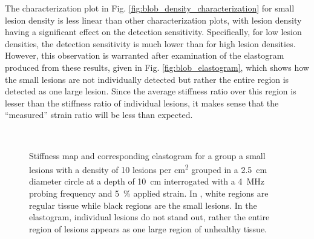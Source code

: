 			The characterization plot in Fig. \ref{fig:blob_density_characterization} for small lesion density is less linear than other characterization plots, with lesion density having a significant effect on the detection sensitivity. Specifically, for low lesion densities, the detection sensitivity is much lower than for high lesion densities. However, this observation is warranted after examination of the elastogram produced from these results, given in Fig. \ref{fig:blob_elastogram}, which shows how the small lesions are not individually detected but rather the entire region is detected as one large lesion. Since the average stiffness ratio over this region is lesser than the stiffness ratio of individual lesions, it makes sense that the ``measured'' strain ratio will be less than expected.

			\begin{figure}[!htb]
				\centering
				~
				\caption[Sample elastogram for a set of clustered lesions]{Stiffness map \protect{} and corresponding elastogram \protect{} for a group a small lesions with a density of 10 lesions per \si{\cm\squared} grouped in a \SI{2.5}{\cm} diameter circle at a depth of \SI{10}{\cm} interrogated with a \SI{4}{\MHz} probing frequency and \SI{5}{\percent} applied strain. In \protect{}, white regions are regular tissue while black regions are the small lesions. In the elastogram, individual lesions do not stand out, rather the entire region of lesions appears as one large region of unhealthy tissue.}

\end{figure}
